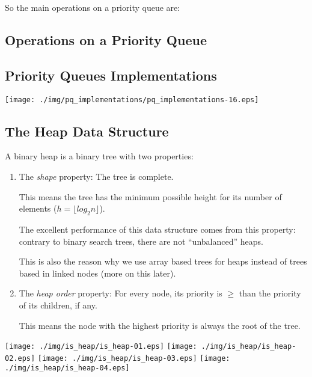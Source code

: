 \documentclass[a4paper, 9pt]{extarticle}
\begin{document}
So the main operations on a priority queue are:


\subsection{Operations on a Priority Queue}


\subsection{Priority Queues Implementations}

\begin{center}
  \texttt{[image: ./img/pq\_implementations/pq\_implementations-16.eps]}
\end{center}


\subsection{The Heap Data Structure}

A binary heap is a binary tree with two properties:

\begin{enumerate}

  \item The \emph{shape} property: The tree is complete.

    This means the tree has the minimum possible height for its number of
    elements ($h = \lfloor log_{2} n \rfloor$).

    The excellent performance of this data structure comes from this property:
    contrary to binary search trees, there are not ``unbalanced'' heaps.

    This is also the reason why we use array based trees for heaps instead of
    trees based in linked nodes (more on this later).

  \item The \emph{heap order} property: For every node, its priority is $\ge$ than the
    priority of its children, if any.

    This means the node with the highest priority is always the root of the tree.

\end{enumerate}

\begin{center}
  \texttt{[image: ./img/is\_heap/is\_heap-01.eps]}
  \texttt{[image: ./img/is\_heap/is\_heap-02.eps]}
  \texttt{[image: ./img/is\_heap/is\_heap-03.eps]}
  \texttt{[image: ./img/is\_heap/is\_heap-04.eps]}
\end{center}
\end{document}
